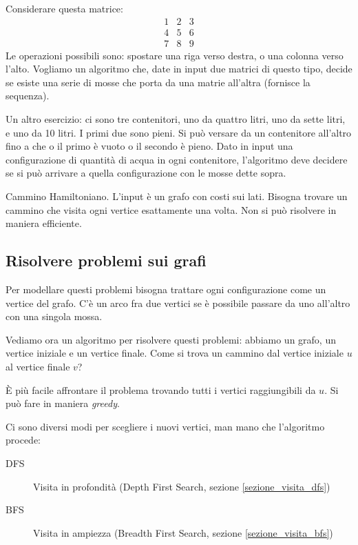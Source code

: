 Considerare questa matrice:
\[
\begin{matrix}
1 & 2 & 3 \\
4 & 5 & 6 \\
7 & 8 & 9
\end{matrix}
\]
Le operazioni possibili sono: spostare una riga verso destra, o una colonna verso l'alto. Vogliamo un algoritmo che, date in input due matrici di questo tipo, decide se esiste una serie di mosse che porta da una matrie all'altra (fornisce la sequenza).

Un altro esercizio: ci sono tre contenitori, uno da quattro litri, uno da sette litri, e uno da 10 litri. I primi due sono pieni. Si pu\`o versare da un contenitore all'altro fino a che o il primo \`e vuoto o il secondo \`e pieno. Dato in input una configurazione di quantit\`a di acqua in ogni contenitore, l'algoritmo deve decidere se si pu\`o arrivare a quella configurazione con le mosse dette sopra.

Cammino Hamiltoniano. L'input \`e un grafo con costi sui lati. Bisogna trovare un cammino che visita ogni vertice esattamente una volta. Non si pu\`o risolvere in maniera efficiente.

\subsection{Risolvere problemi sui grafi}

Per modellare questi problemi bisogna trattare ogni configurazione come un vertice del grafo. C'\`e un arco fra due vertici se \`e possibile passare da uno all'altro con una singola mossa.

Vediamo ora un algoritmo per risolvere questi problemi: abbiamo un grafo, un vertice iniziale e un vertice finale. Come si trova un cammino dal vertice iniziale $u$ al vertice finale $v$?

\`E pi\`u facile affrontare il problema trovando tutti i vertici raggiungibili da $u$. Si pu\`o fare in maniera \emph{greedy}. 

Ci sono diversi modi per scegliere i nuovi vertici, man mano che l'algoritmo procede:
\begin{description}
    \item[DFS] Visita in profondit\`a (Depth First Search, sezione \ref{sezione_visita_dfs})
    \item[BFS] Visita in ampiezza (Breadth First Search, sezione \ref{sezione_visita_bfs})
\end{description}

